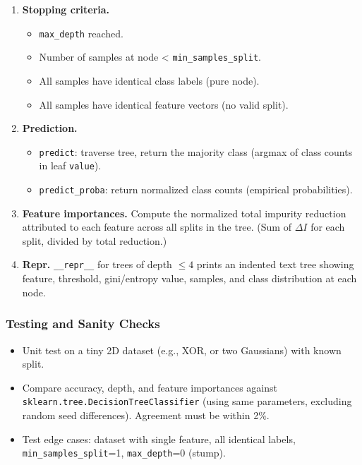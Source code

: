 \documentclass[11pt,a4paper]{article}
\begin{document}
\begin{enumerate}[leftmargin=2.2em,label=\textbf{DT.\arabic*}]
\begin{itemize}
\begin{enumerate}
          \item If \texttt{max\_features} is set, randomly select a subset of features (without replacement) at each node, using \texttt{random\_state} for reproducibility.
        \end{enumerate}
      \item Handle the degenerate case: if no split reduces impurity, or if all samples belong to one class, or \texttt{min\_samples\_split} is violated, the node becomes a leaf.
    \end{itemize}
  \item \textbf{Stopping criteria.}
    \begin{itemize}
      \item \texttt{max\_depth} reached.
      \item Number of samples at node < \texttt{min\_samples\_split}.
      \item All samples have identical class labels (pure node).
      \item All samples have identical feature vectors (no valid split).
    \end{itemize}
  \item \textbf{Prediction.}
    \begin{itemize}
      \item \texttt{predict}: traverse tree, return the majority class (argmax of class counts in leaf \texttt{value}).
      \item \texttt{predict\_proba}: return normalized class counts (empirical probabilities).
    \end{itemize}
  \item \textbf{Feature importances.} Compute the normalized total impurity reduction attributed to each feature across all splits in the tree. (Sum of $\Delta I$ for each split, divided by total reduction.)
  \item \textbf{Repr.} \texttt{\_\_repr\_\_} for trees of depth $\le 4$ prints an indented text tree showing feature, threshold, gini/entropy value, samples, and class distribution at each node.
\end{enumerate}
\subsubsection{Testing and Sanity Checks}
\begin{itemize}
  \item Unit test on a tiny 2D dataset (e.g., XOR, or two Gaussians) with known split.
  \item Compare accuracy, depth, and feature importances against \texttt{sklearn.tree.DecisionTreeClassifier} (using same parameters, excluding random seed differences). Agreement must be within 2\%.
  \item Test edge cases: dataset with single feature, all identical labels, \texttt{min\_samples\_split}=1, \texttt{max\_depth}=0 (stump).
\end{itemize}
\end{document}
